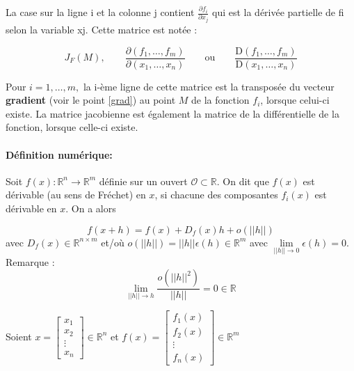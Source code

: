 	La case sur la ligne i et la colonne j contient ${\displaystyle {\frac {\partial f_{i}}{\partial x_{j}}}}$ qui est la dérivée partielle de fi selon la variable xj. Cette matrice est notée :
	
	$${\displaystyle J_{F}\left(M\right),\qquad {\frac {\partial \left(f_{1},\ldots ,f_{m}\right)}{\partial \left(x_{1},\ldots ,x_{n}\right)}}\qquad {\text{ou}}\qquad {\frac {\mathrm {D} \left(f_{1},\ldots ,f_{m}\right)}{\mathrm {D} \left(x_{1},\ldots ,x_{n}\right)}}}$$
	
	Pour $i = 1, … , m,$ la i-ème ligne de cette matrice est la transposée du vecteur \textbf{gradient} (voir le point \ref{grad}) au point $M$ de la fonction $f_i$, lorsque celui-ci existe. La matrice jacobienne est également la matrice de la différentielle de la fonction, lorsque celle-ci existe.
	\paragraph*{Définition numérique:}
	
	Soit $f(x) : \mathbb{R}^n \to \mathbb{R}^m$ définie sur un ouvert $ \mathcal{O} \subset \mathbb{R} $. On dit que $f(x)$ est dérivable
	(au sens de Fréchet) en $x$, si chacune des composantes $f_i(x)$ est dérivable  en $x$. On a alors
	
	\begin{equation}
	f(x + h) = f(x) + D_f (x)h + o(||h||)
	\end{equation}
	avec $D_f (x) \in  \mathbb{R}^{n \times m} $ et/où $ o(||h||)=||h|| \epsilon(h) \in \mathbb{R}^m $ avec $\lim\limits_{||h|| \to 0} \epsilon(h) = 0 $.
	Remarque :
	$$
	\lim\limits_{||h|| \to h} \frac{o(||h||^2)}{||h||} = 0  \in \mathbb{R}
	$$
	
	Soient
	$x =
	\begin{bmatrix}
	x_1 \\ x_2\\ \vdots \\ x_n
	\end{bmatrix}
	\in \mathbb{R}^n $ et $
	f(x) =
	\begin{bmatrix}
	f_1(x) \\ f_2(x)\\ \vdots \\ f_n(x)
	\end{bmatrix} \in \mathbb{R}^m
	$
	
